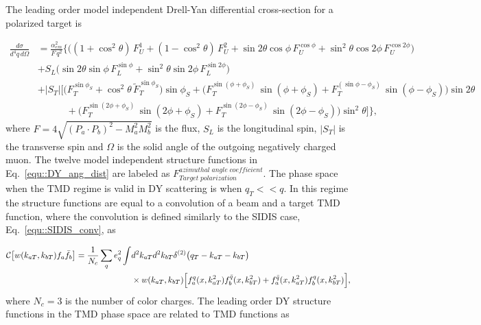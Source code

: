 The leading order model independent Drell-Yan differential cross-section for a
polarized target is~\cite{DYxSection,AKotzininaNote}

\begin{align} \label{equ::DY_ang_dist}
  \frac{d\sigma}{d^4 q \, d \Omega} &=
  \frac{\alpha_{em}^2}{F \, q^2}
  \Big \{ \Big(
   (1 + \cos^2 \theta) \, F_{U}^{1} 
 + (1 - \cos^2 \theta) \, F_{U}^{2} 
 + \sin 2\theta \cos \phi \, F_{U}^{\cos \phi} 
 + \sin^2 \theta \cos 2\phi \, F_{U}^{\cos 2\phi} \Big)
 \nonumber \\
 &+ S_{L} \Big( 
   \sin 2\theta \sin \phi \, F_{L}^{\sin \phi} 
   + \sin^2 \theta \sin 2\phi \, F_{L}^{\sin 2\phi} \Big)
   \nonumber \\
   &+ |S_{T}|
   \Big[ \Big(
     F_{T}^{\sin \phi_S} + \cos^2 \theta \, \tilde{F}_{T}^{\sin \phi_S}
     \Big)\sin \phi_{S} 
     + \Big( F_{T}^{\sin (\phi +\phi_S)} \, \sin(\phi+\phi_S) +
     F_{T}^{(\sin \phi - \phi_S)}\, \sin(\phi-\phi_S) \Big)\sin 2\theta
     \nonumber \\
     & \quad\quad\quad +
     \Big( F_{T}^{\sin (2\phi +\phi_S)}\, \sin(2\phi+\phi_S) +
     F_{T}^{\sin (2\phi - \phi_S)}\, \sin(2\phi-\phi_S) \Big)\sin ^2\theta
     \Big ]
   \Big \},
\end{align}
\noindent
where $F = 4\sqrt{(P_a \cdot P_b)^2 - M_a^2M_b^2}$ is the flux, $S_L$ is the
longitudinal spin, $|S_T|$ is the transverse spin and $\Omega$ is the solid
angle of the outgoing negatively charged muon.  The twelve model independent
structure functions in Eq.~\ref{equ::DY_ang_dist} are labeled as $F_{Target \;
  polarization}^{azimuthal \;angle\;coefficient}$.  The phase space when the TMD
regime is valid in DY scattering is when $q_T << q$.  In this regime the
structure functions are equal to a convolution of a beam and a target TMD
function, where the convolution is defined similarly to the SIDIS case,
Eq.~\ref{equ::SIDIS_conv}, as

\begin{align}
  \label{equ::DY_conv}
  \nonumber
      {\cal C}\bigl[ w(k_{aT}, k_{bT}) f_a \bar{f}_b \bigr] =
      \frac{1}{N_c} \sum_q e_q^2 \int &d^2 k_{aT} d^2 k_{bT} 
      \delta^{(2)}\bigl(q_T - k_{aT} - k_{bT} \bigr) \\
      &\times w(k_{aT},k_{bT})
        \Big[ f_a^q(x,k_{aT}^2)f_b^{\bar{q}}(x,k_{bT}^2) +
          f_a^{\bar{q}}(x,k_{aT}^2)f_b^{q}(x,k_{bT}^2) \Big],
\end{align}
\noindent
where $N_c = 3$ is the number of color charges.  The leading order DY
structure functions in the TMD phase space are related to TMD functions
as~\cite{DYxSection}

